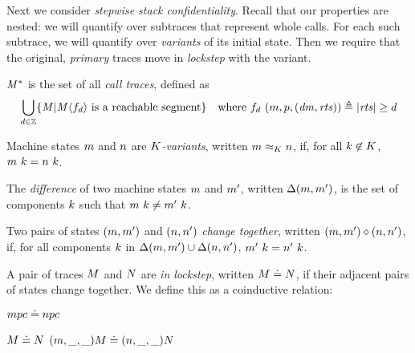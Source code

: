 \documentclass[acmsmall,review,anonymous]{acmart}\settopmatter{printfolios=true,printccs=false,printacmref=false}
\begin{document}
Next we consider {\em stepwise stack confidentiality}. Recall that our properties are
nested: we will quantify over subtraces that represent whole calls. For each such
subtrace, we will quantify over {\em variants} of its initial state. Then we require
that the original, {\em primary} traces move in {\em lockstep} with the variant.

 \(\mathit{M}^*\) is the set of all \emph{call traces}, defined as
\[\begin{aligned}
\bigcup_{d \in \mathbb{Z}} \{\mathit{M} | \mathit{M}\langle f_d \rangle
\text{ is a reachable segment}\} \hspace{1em} &
\text{where } f_d ~ (m,p,(\mathit{dm},\mathit{rts})) \triangleq |\mathit{rts}| \geq d \\
\end{aligned}\]

 Machine states \(m\) and \(n\) are {\em \(K\)-variants},
written \(m \approx_K n\), if, for
all \(k \not \in K\), \(m ~ k = n ~ k\).

 The \emph{difference} of two machine states \(m\) and \(m'\), written \(\Delta(m,m')\),
is the set of components \(k\)
such that \(m ~ k \not = m' ~ k\).

 Two pairs of states \((m,m')\) and \((n,n')\)
 {\em change together}, written \((m,m') \diamond (n,n')\), if, for all components \(k\) in
\(\Delta(m,m') \cup \Delta(n,n')\),
\(m' ~ k = n' ~ k\). 

 A pair of traces \(M\) and \(N\) are {\em in lockstep},
written \(M \doteq N\), 
if their adjacent pairs of states change together.  We define this as a coinductive relation:

\begin{minipage}{.3\textwidth}
\judgment{}
         {\(mpc \doteq npc\)}
\end{minipage}
\begin{minipage}{.6\textwidth}
\judgmenttwo{\(\mach, \pi_\mach(\head(\machT)) \diamond \nach, \pi_\mach(\head(\nachT))\)}
            {\(M \doteq N\)}
            {\((m,\_,\_) M \doteq (n,\_,\_) N\)}
\end{minipage}

\end{document}
